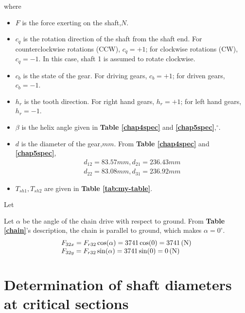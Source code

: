 where
\begin{itemize}
	\item $ F $ is the force exerting on the shaft,$ \unit{N} $.
	\item $ c_q $ is the rotation direction of the shaft from the shaft end. For counterclockwise rotations (CCW), $ c_q=+1 $; for clockwise rotations (CW), $ c_q=-1 $. In this case, shaft 1 is assumed to rotate clockwise.
	\item $ c_b $ is the state of the gear. For driving gears, $ c_b=+1 $; for driven gears, $ c_b=-1 $.
	\item $ h_r $ is the tooth direction. For right hand gears, $ h_r= +1$; for left hand gears, $ h_r=-1 $.
	\item $ \beta $ is the helix angle given in \textbf{Table \ref{chap4spec}} and \textbf{\ref{chap5spec}},$ ^\circ $.
	\item $ d $ is the diameter of the gear,$ \unit{mm} $. From \textbf{Table \ref{chap4spec}} and \textbf{\ref{chap5spec}},
	\[
	\begin{array}{l}
	d_{12}=83.57\unit{mm},d_{21}=236.43\unit{mm}\\
	d_{22}=83.08\unit{mm},d_{31}=236.92\unit{mm}
	\end{array}
	\]
	\item $ T_{sh1},T_{sh2} $ are given in \textbf{Table \ref{tab:my-table}}.
\end{itemize}

Let $  $

Let $ \alpha $ be the angle of the chain drive with respect to ground. From \textbf{Table \ref{chain}}'s description, the chain is parallel to ground, which makes $ \alpha = 0^\circ $.
\[
\begin{array}{l}
F_{32x} = F_{r32}\cos(\alpha) = 3741\cos(0) = 3741 \, (\mathrm{N})\\
F_{32y} = F_{r32}\sin(\alpha) = 3741\sin(0) = 0 \, (\mathrm{N})\\
\end{array}
\]

\section{Determination of shaft diameters at critical sections}
